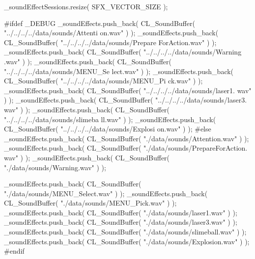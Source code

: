 \begin{DoxyCode}
{
        _soundEffectSessions.resize( SFX_VECTOR_SIZE );

#ifdef _DEBUG
        _soundEffects.push_back( CL_SoundBuffer( "../../../../data/sounds/Attenti
      on.wav" ) );
        _soundEffects.push_back( CL_SoundBuffer( "../../../../data/sounds/Prepare
      ForAction.wav" ) );
        _soundEffects.push_back( CL_SoundBuffer( "../../../../data/sounds/Warning
      .wav" ) );
        _soundEffects.push_back( CL_SoundBuffer( "../../../../data/sounds/MENU_Se
      lect.wav" ) );
        _soundEffects.push_back( CL_SoundBuffer( "../../../../data/sounds/MENU_Pi
      ck.wav" ) );
        _soundEffects.push_back( CL_SoundBuffer( "../../../../data/sounds/laser1.
      wav" ) );
        _soundEffects.push_back( CL_SoundBuffer( "../../../../data/sounds/laser3.
      wav" ) );
        _soundEffects.push_back( CL_SoundBuffer( "../../../../data/sounds/slimeba
      ll.wav" ) );
        _soundEffects.push_back( CL_SoundBuffer( "../../../../data/sounds/Explosi
      on.wav" ) );
#else
        _soundEffects.push_back( CL_SoundBuffer( "./data/sounds/Attention.wav" ) 
      );
        _soundEffects.push_back( CL_SoundBuffer( "./data/sounds/PrepareForAction.
      wav" ) );
        _soundEffects.push_back( CL_SoundBuffer( "./data/sounds/Warning.wav" ) );
      
        _soundEffects.push_back( CL_SoundBuffer( "./data/sounds/MENU_Select.wav" 
      ) );
        _soundEffects.push_back( CL_SoundBuffer( "./data/sounds/MENU_Pick.wav" ) 
      );
        _soundEffects.push_back( CL_SoundBuffer( "./data/sounds/laser1.wav" ) );
        _soundEffects.push_back( CL_SoundBuffer( "./data/sounds/laser3.wav" ) );
        _soundEffects.push_back( CL_SoundBuffer( "./data/sounds/slimeball.wav" ) 
      );
        _soundEffects.push_back( CL_SoundBuffer( "./data/sounds/Explosion.wav" ) 
      );
#endif
        
}
\end{DoxyCode}


